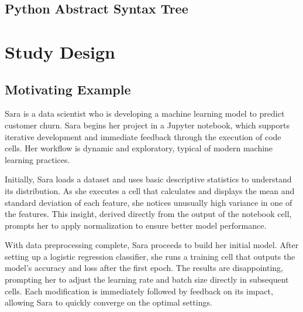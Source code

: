 

\subsection{Python Abstract Syntax Tree}


\section{Study Design}

\subsection{Motivating Example}

Sara is a data scientist who is developing a machine learning model to predict customer churn. Sara begins her project in a Jupyter notebook, which supports iterative development and immediate feedback through the execution of code cells. Her workflow is dynamic and exploratory, typical of modern machine learning practices.

Initially, Sara loads a dataset and uses basic descriptive statistics to understand its distribution. As she executes a cell that calculates and displays the mean and standard deviation of each feature, she notices unusually high variance in one of the features. This insight, derived directly from the output of the notebook cell, prompts her to apply normalization to ensure better model performance.

With data preprocessing complete, Sara proceeds to build her initial model. After setting up a logistic regression classifier, she runs a training cell that outputs the model's accuracy and loss after the first epoch. The results are disappointing, prompting her to adjust the learning rate and batch size directly in subsequent cells. Each modification is immediately followed by feedback on its impact, allowing Sara to quickly converge on the optimal settings.

